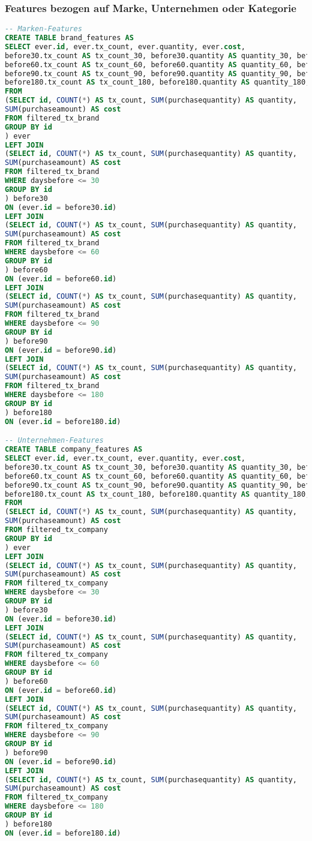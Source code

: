 \subsubsection{Features bezogen auf Marke, Unternehmen oder Kategorie}
\label{sql:features_bcc}
\begin{lstlisting}[language=SQL]
-- Marken-Features
CREATE TABLE brand_features AS
SELECT ever.id, ever.tx_count, ever.quantity, ever.cost,
before30.tx_count AS tx_count_30, before30.quantity AS quantity_30, before30.cost AS cost_30,
before60.tx_count AS tx_count_60, before60.quantity AS quantity_60, before60.cost AS cost_60,
before90.tx_count AS tx_count_90, before90.quantity AS quantity_90, before90.cost AS cost_90,
before180.tx_count AS tx_count_180, before180.quantity AS quantity_180, before180.cost AS cost_180
FROM 
(SELECT id, COUNT(*) AS tx_count, SUM(purchasequantity) AS quantity, 
SUM(purchaseamount) AS cost
FROM filtered_tx_brand
GROUP BY id
) ever
LEFT JOIN
(SELECT id, COUNT(*) AS tx_count, SUM(purchasequantity) AS quantity, 
SUM(purchaseamount) AS cost
FROM filtered_tx_brand
WHERE daysbefore <= 30
GROUP BY id
) before30
ON (ever.id = before30.id)
LEFT JOIN
(SELECT id, COUNT(*) AS tx_count, SUM(purchasequantity) AS quantity, 
SUM(purchaseamount) AS cost
FROM filtered_tx_brand
WHERE daysbefore <= 60
GROUP BY id
) before60
ON (ever.id = before60.id)
LEFT JOIN
(SELECT id, COUNT(*) AS tx_count, SUM(purchasequantity) AS quantity, 
SUM(purchaseamount) AS cost
FROM filtered_tx_brand
WHERE daysbefore <= 90
GROUP BY id
) before90
ON (ever.id = before90.id)
LEFT JOIN 
(SELECT id, COUNT(*) AS tx_count, SUM(purchasequantity) AS quantity, 
SUM(purchaseamount) AS cost
FROM filtered_tx_brand
WHERE daysbefore <= 180
GROUP BY id
) before180
ON (ever.id = before180.id)

-- Unternehmen-Features
CREATE TABLE company_features AS
SELECT ever.id, ever.tx_count, ever.quantity, ever.cost,
before30.tx_count AS tx_count_30, before30.quantity AS quantity_30, before30.cost AS cost_30,
before60.tx_count AS tx_count_60, before60.quantity AS quantity_60, before60.cost AS cost_60,
before90.tx_count AS tx_count_90, before90.quantity AS quantity_90, before90.cost AS cost_90,
before180.tx_count AS tx_count_180, before180.quantity AS quantity_180, before180.cost AS cost_180
FROM 
(SELECT id, COUNT(*) AS tx_count, SUM(purchasequantity) AS quantity, 
SUM(purchaseamount) AS cost
FROM filtered_tx_company
GROUP BY id
) ever
LEFT JOIN
(SELECT id, COUNT(*) AS tx_count, SUM(purchasequantity) AS quantity, 
SUM(purchaseamount) AS cost
FROM filtered_tx_company
WHERE daysbefore <= 30
GROUP BY id
) before30
ON (ever.id = before30.id)
LEFT JOIN
(SELECT id, COUNT(*) AS tx_count, SUM(purchasequantity) AS quantity, 
SUM(purchaseamount) AS cost
FROM filtered_tx_company
WHERE daysbefore <= 60
GROUP BY id
) before60
ON (ever.id = before60.id)
LEFT JOIN
(SELECT id, COUNT(*) AS tx_count, SUM(purchasequantity) AS quantity, 
SUM(purchaseamount) AS cost
FROM filtered_tx_company
WHERE daysbefore <= 90
GROUP BY id
) before90
ON (ever.id = before90.id)
LEFT JOIN 
(SELECT id, COUNT(*) AS tx_count, SUM(purchasequantity) AS quantity, 
SUM(purchaseamount) AS cost
FROM filtered_tx_company
WHERE daysbefore <= 180
GROUP BY id
) before180
ON (ever.id = before180.id)


\end{lstlisting}

